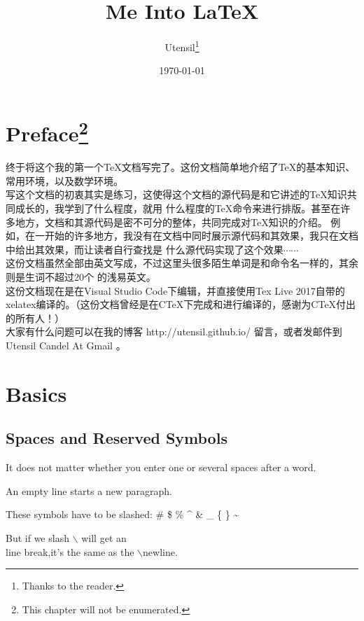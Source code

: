 \documentclass[a4paper]{report}
\title{Me Into \LaTeX}
\author{Utensil\thanks{Thanks to the reader.}}
\date{\today}
\begin{document}
\maketitle
\chapter*{Preface\footnote{This chapter will not be enumerated.}}

终于将这个我的第一个\TeX{}文档写完了。这份文档简单地介绍了\TeX{}的基本知识、常用环境，以及数学环境。\\

写这个文档的初衷其实是练习，这使得这个文档的源代码是和它讲述的\TeX{}知识共同成长的，我学到了什么程度，就用
什么程度的\TeX{}命令来进行排版。甚至在许多地方，文档和其源代码是密不可分的整体，共同完成对\TeX{}知识的介绍。
例如，在一开始的许多地方，我没有在文档中同时展示源代码和其效果，我只在文档中给出其效果，而让读者自行查找是
什么源代码实现了这个效果$\cdots\cdots$\\

这份文档虽然全部由英文写成，不过这里头很多陌生单词是和命令名一样的，其余则是生词不超过20个
的浅易英文。\\

这份文档现在是在Visual Studio Code下编辑，并直接使用Tex Live 2017自带的xelatex编译的。（这份文档曾经是在C\TeX{}下完成和进行编译的，感谢为C\TeX{}付出的所有人！）\\

大家有什么问题可以在我的博客 http://utensil.github.io/ 留言，或者发邮件到 Utensil Candel At Gmail 。\\

\tableofcontents
\chapter{Basics}
\section{Spaces and Reserved Symbols}

It does not matter whether you enter one or several spaces after a
word.

An empty line starts a new paragraph.

These symbols have to be slashed: \# \$ \% \^{} \& \_ \{ \} \~{}

But if we slash $\backslash$ will get an \\ line break,it's the same
as the
\newline $\backslash$newline.
\end{document}
